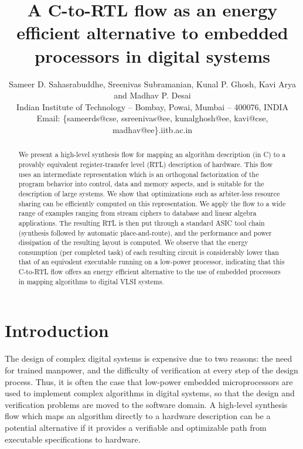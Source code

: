 \documentclass[conference]{IEEEtran}
\title{A C-to-RTL flow as an energy efficient alternative to embedded
  processors in digital systems}
\author{Sameer D. Sahasrabuddhe, Sreenivas
  Subramanian, Kunal P. Ghosh, Kavi Arya and Madhav P. Desai\\
  Indian Institute of Technology -- Bombay, Powai, Mumbai -- 400076, INDIA\\
  Email: \{sameerds@cse, ssreenivas@ee, kunalghosh@ee, kavi@cse,
  madhav@ee\}.iitb.ac.in }
\begin{document}
\maketitle
\thispagestyle{empty}

\begin{abstract}

  We present a high-level synthesis flow for mapping an algorithm
  description (in C) to a provably equivalent register-transfer level
  (RTL) description of hardware. This flow uses an intermediate
  representation which is an orthogonal factorization of the program
  behavior into control, data and memory aspects, and is suitable for
  the description of large systems. We show that optimizations such as
  arbiter-less resource sharing can be efficiently computed on this
  representation. We apply the flow to a wide range of examples
  ranging from stream ciphers to database and linear algebra
  applications. The resulting RTL is then put through a standard ASIC
  tool chain (synthesis followed by automatic place-and-route), and
  the performance and power dissipation of the resulting layout is
  computed. We observe that the energy consumption (per completed
  task) of each resulting circuit is considerably lower than that of
  an equivalent executable running on a low-power processor,
  indicating that this C-to-RTL flow offers an energy efficient
  alternative to the use of embedded processors in mapping algorithms
  to digital VLSI systems.

\end{abstract}

\section{Introduction}


The design of complex digital systems is expensive due to two reasons:
the need for trained manpower, and the difficulty of verification at
every step of the design process. Thus, it is often the case that
low-power embedded microprocessors are used to implement complex
algorithms in digital systems, so that the design and verification
problems are moved to the software domain. A high-level synthesis flow
which maps an algorithm directly to a hardware description can be a
potential alternative if it provides a verifiable and optimizable path
from executable specifications\cite{gajski-executable-specification}
to hardware.   
\end{document}
